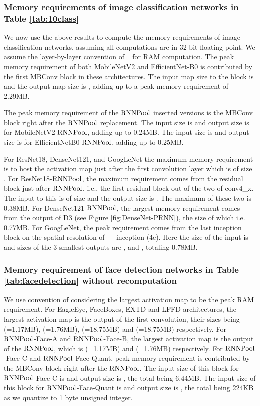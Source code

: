 \documentclass[10pt]{article}
\newcommand{\rpool}{\ensuremath{{\rm RNNPool}}\xspace}
\begin{document}
\subsubsection{Memory requirements of image classification networks in Table \ref{tab:10class}}
\label{sec:ramcalculation10class}
We now use the above results to compute the memory requirements of
image classification networks, assuming all computations are in 32-bit
floating-point. We assume the layer-by-layer convention of
~\cite{chowdhery2019visual} for RAM computation.  The peak memory
requirement of both MobileNetV2 and EfficientNet-B0 is contributed by
the first MBConv block in these architectures. The input map size to
the block is  and the output map size is , adding up to a peak memory requirement of 2.29MB.

The peak memory requirement of the \rpool inserted versions is the
MBConv block right after the \rpool replacement. The input size is  and output size is  for
MobileNetV2-\rpool, adding up to 0.24MB. The input size is  and output size is  for
EfficientNetB0-\rpool, adding up to 0.25MB.

For ResNet18, DenseNet121, and GoogLeNet the maximum memory requirement
is to host the activation map just after the first convolution layer
which is of size .  For ResNet18-\rpool, the
maximum requirement comes from the residual block just after \rpool,
i.e., the first residual block out of the two of conv4\_x. The input
to this is of size  and the output size is . The maximum of these two is 0.38MB. For
DenseNet121-\rpool, the largest memory requirement comes from the
output of D3 (see Figure \ref{fig:DenseNet-PRNN}), the size of which
 i.e. 0.77MB. For GoogLeNet, the peak
requirement comes from the last inception block on the spatial resolution
of  --- inception (4e).  Here the size of the input is  and sizes of the 3 smallest outputs are ,  and , totaling 0.78MB.



\subsubsection{Memory requirement of  face detection networks in Table \ref{tab:facedetection} without recomputation}
We use convention of considering the largest activation map to be the
peak RAM requirement. For EagleEye, FaceBoxes, EXTD and LFFD
architectures, the largest activation map is the output of the first
convolution, their sizes being  (=1.17MB),
 (=1.76MB), 
(=18.75MB) and  (=18.75MB) respectively. For
\rpool-Face-A and \rpool-Face-B, the largest activation map is the
output of the \rpool, which is  (=1.17MB)
and  (=1.76MB) respectively.  For
\rpool-Face-C and \rpool-Face-Quant, peak memory requirement is
contributed by the MBConv block right after the \rpool. The input size
of this block for \rpool-Face-C is  and
output size is , the total being 6.44MB. The
input size of this block for \rpool-Face-Quant is  and output size is , the total being 224KB
as we quantize to 1 byte unsigned integer.
\end{document}
